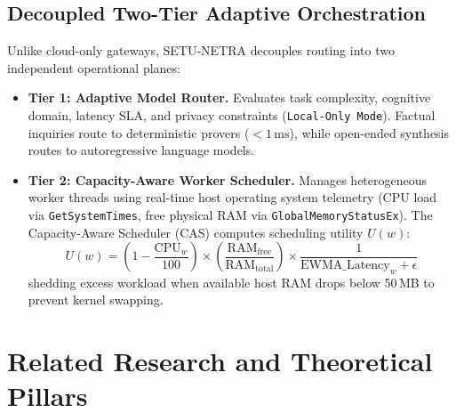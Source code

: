 \documentclass[11pt,a4paper]{article}
\begin{document}
\subsection{Decoupled Two-Tier Adaptive Orchestration}
Unlike cloud-only gateways, SETU-NETRA decouples routing into two independent operational planes:
\begin{itemize}[leftmargin=*]
    \item \textbf{Tier 1: Adaptive Model Router.} Evaluates task complexity, cognitive domain, latency SLA, and privacy constraints (\texttt{Local-Only Mode}). Factual inquiries route to deterministic provers ($< 1\,\text{ms}$), while open-ended synthesis routes to autoregressive language models.
    \item \textbf{Tier 2: Capacity-Aware Worker Scheduler.} Manages heterogeneous worker threads using real-time host operating system telemetry (CPU load via \texttt{GetSystemTimes}, free physical RAM via \texttt{GlobalMemoryStatusEx}). The Capacity-Aware Scheduler (CAS) computes scheduling utility $U(w)$:
    \begin{equation}
        U(w) = \left( 1 - \frac{\text{CPU}_w}{100} \right) \times \left( \frac{\text{RAM}_{\text{free}}}{\text{RAM}_{\text{total}}} \right) \times \frac{1}{\text{EWMA\_Latency}_w + \epsilon}
    \end{equation}
    shedding excess workload when available host RAM drops below 50\,MB to prevent kernel swapping.
\end{itemize}

\section{Related Research and Theoretical Pillars}
\label{sec:related}
\end{document}
